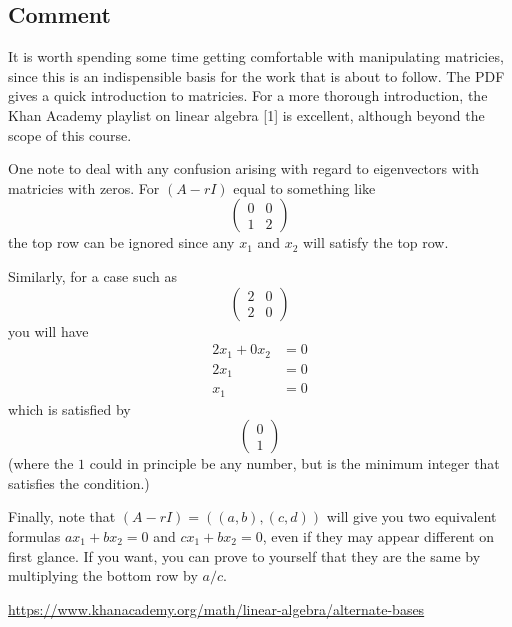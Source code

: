 \subsection*{Comment}
It is worth spending some time getting comfortable with manipulating matricies, since this is an indispensible basis for the work that is about to follow. The PDF gives a quick introduction to matricies. For a more thorough introduction, the Khan Academy playlist on linear algebra [1] is excellent, although beyond the scope of this course.

One note to deal with any confusion arising with regard to eigenvectors with matricies with zeros. For $(A-rI)$ equal to something like
\begin{equation}
\left(
    \begin{array}{cc}
        0 & 0 \\
        1 & 2
    \end{array}
\right)
\end{equation}
the top row can be ignored since any $x_1$ and $x_2$ will satisfy the top row.

Similarly, for a case such as
\begin{equation}
\left(
    \begin{array}{cc}
        2 & 0 \\
        2 & 0
    \end{array}
\right)
\end{equation}
you will have
\begin{align}
    2 x_1 + 0 x_2 &= 0 \\
    2 x_1 &= 0 \\
    x_1 &= 0
\end{align}
which is satisfied by
\begin{equation}
\left(
    \begin{array}{c}
        0 \\
        1
    \end{array}
\right)
\end{equation}
(where the $1$ could in principle be any number, but is the minimum integer that satisfies the condition.)

Finally, note that $(A-rI) = ((a, b), (c, d))$ will give you two equivalent formulas $a x_1 + b x_2 = 0$ and $c x_1 + b x_2 = 0$, even if they may appear different on first glance. If you want, you can prove to yourself that they are the same by multiplying the bottom row by $a/c$.

\vspace{0.2cm}
\noindent [1] \url{https://www.khanacademy.org/math/linear-algebra/alternate-bases}

